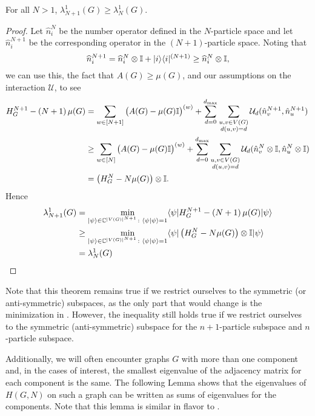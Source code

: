 \documentclass[../thesis-main/thesis-main]{subfiles}
\begin{document}
\begin{lemma}
  For all $N>1$, $\lambda_{N+1}^1(G) \geq \lambda_{N}^1(G)$.
  \label{lem:MPQW_particle_number_eigenvalues}
\end{lemma}
\begin{proof}
Let $\widehat{n}_{i}^{N}$ be the number operator  defined in the $N$-particle space and let $\widehat{n}_{i}^{N+1}$ be the corresponding operator in the $\left(N+1\right)$-particle space. Noting that
\begin{equation}
\widehat{n}_{i}^{N+1} = \widehat{n}_{i}^{N}\otimes\mathbb{I}+|i\rangle\langle i|^{(N+1)} \geq \widehat{n}_{i}^{N}\otimes\mathbb{I},
\end{equation}
we can use this, the fact that $A(G)\geq\mu(G)$, and our assumptions on the interaction $\mathcal{U}$, to see 
\begin{align}
H_{G}^{N+1}-\left(N+1\right)\mu(G)&=\sum_{w\in[N+1]} \big( A(G)- \mu(G)\mathbb{I}\big)^{(w)} + \sum_{d=0}^{d_{\text{max}}} \sum_{\substack{u,v\in V(G)\\d(u,v) = d}} \mathcal{U}_d (\hat{n}_v^{N+1},\hat{n}_u^{N+1})\\
&\geq \sum_{w\in[N]}\big( A(G) - \mu(G)\mathbb{I}\big)^{(w)} + \sum_{d=0}^{d_{\text{max}}} \sum_{\substack{u,v\in V(G)\\d(u,v) = d}} \mathcal{U}_d (\hat{n}_v^{N}\otimes \mathbb{I},\hat{n}_u^{N}\otimes \mathbb{I})\\
& = \big( H_G^N - N\mu(G) \big)\otimes \mathbb{I}.
\end{align}
Hence 
\begin{align}
  \lambda_{N+1}^{1}(G) & =\min_{|\psi\rangle\in\mathbb{C}^{|V(G)|^{N+1}}\colon \langle\psi|\psi\rangle=1}\langle\psi|H_{G}^{N+1}-\left(N+1\right)\mu(G)|\psi\rangle\label{eq:MPQW_particle_number_min}\\
 & \geq\min_{|\psi\rangle\in\mathbb{C}^{|V(G)|^{N+1}}\colon \langle\psi|\psi\rangle=1}\langle\psi|\left(H_{G}^{N}-N\mu(G)\right)\otimes\mathbb{I} |\psi\rangle\\
 & =\lambda_{N}^{1}(G)\qedhere
\end{align}
\end{proof}

Note that this theorem remains true if we restrict ourselves to the symmetric (or anti-symmetric) subspaces, as the only part that would change is the minimization in .  However, the inequality still holds true if we restrict ourselves to the symmetric (anti-symmetric) subspace for the $n+1$-particle subspace and $n$-particle subspace.


Additionally, we will often encounter graphs $G$ with more than one component and, in the cases of interest, the smallest eigenvalue of the adjacency matrix for each component is the same. The following Lemma shows that the eigenvalues of $H(G,N)$ on such a graph can be written as sums of eigenvalues for the components. Note that this lemma is similar in flavor to .
\end{document}
